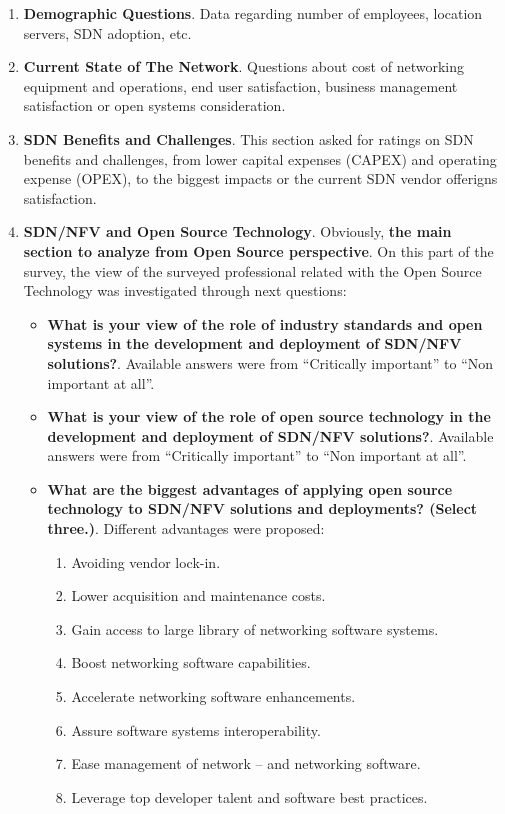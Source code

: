 \documentclass[a4paper, 12pt]{book}
\begin{document}
\begin{enumerate}\itemsep0pt
\item{\textbf{Demographic Questions}}. Data regarding number of employees, location servers, SDN adoption, etc.
\item{\textbf{Current State of The Network}}. Questions about cost of networking equipment and operations, end user satisfaction, business management satisfaction or open systems consideration.
\item{\textbf{SDN Benefits and Challenges}}. This section asked for ratings on SDN benefits and challenges, from lower capital expenses (CAPEX) and operating expense (OPEX), to the biggest impacts or the current SDN vendor offerigns satisfaction.
\item{\textbf{SDN/NFV and Open Source Technology}}. Obviously, \textbf{the main section to analyze from Open Source perspective}. On this part of the survey, the view of the surveyed professional related with the Open Source Technology was investigated through next questions:
\begin{itemize}\itemsep0pt
\item{\textbf{What is your view of the role of industry standards and open systems in the development and deployment of SDN/NFV solutions?}}. Available answers were from ``Critically important'' to ``Non important at all''.
\item{\textbf{What is your view of the role of open source technology in the development and deployment of SDN/NFV solutions?}}. Available answers were from ``Critically important'' to ``Non important at all''.
\item{\textbf{What are the biggest advantages of applying open source technology to SDN/NFV solutions and deployments? (Select three.)}}. Different advantages were proposed: 
\begin{enumerate}\itemsep0pt
\item{Avoiding vendor lock-in}.
\item{Lower acquisition and maintenance costs}.
\item{Gain access to large library of networking software systems}.
\item{Boost networking software capabilities}.
\item{Accelerate networking software enhancements}.
\item{Assure software systems interoperability}.
\item{Ease management of network -- and networking software}.
\item{Leverage top developer talent and software best practices}.

\end{enumerate}
\end{itemize}
\end{enumerate}
\end{document}
